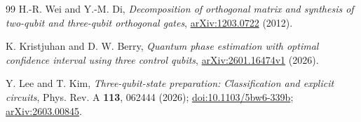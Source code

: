 \documentclass[11pt,a4paper]{article}
\theoremstyle{definition}
\theoremstyle{plain}
\begin{document}
\begin{thebibliography}{99}
H.-R. Wei and Y.-M. Di,
\emph{Decomposition of orthogonal matrix and synthesis of two-qubit and
three-qubit orthogonal gates},
\href{https://arxiv.org/abs/1203.0722}{arXiv:1203.0722} (2012).

K. Kristjuhan and D. W. Berry,
\emph{Quantum phase estimation with optimal confidence interval using three
control qubits},
\href{https://arxiv.org/abs/2601.16474v1}{arXiv:2601.16474v1} (2026).

Y. Lee and T. Kim,
\emph{Three-qubit-state preparation: Classification and explicit circuits},
Phys. Rev. A \textbf{113}, 062444 (2026);
\href{https://doi.org/10.1103/5bw6-339b}{doi:10.1103/5bw6-339b};
\href{https://arxiv.org/abs/2603.00845}{arXiv:2603.00845}.
\end{thebibliography}
\end{document}
